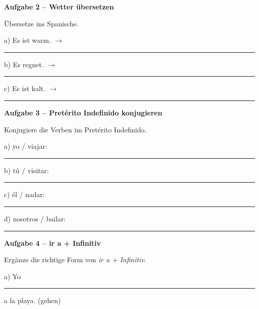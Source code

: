 \documentclass[11pt, a4paper]{article}
\newcommand{\fachfarbe}{spanisch}
\newcommand{\punktebox}[1]{\hfill\fbox{\small \_/#1}}
\newcommand{\luecke}[1]{\rule{#1}{0.4pt}}
\newenvironment{aufgabe}[1]{%
    \needspace{5\baselineskip}%
    \nopagebreak[4]%
    \vspace{10pt}
    \noindent\textbf{\textcolor{\fachfarbe}{Aufgabe #1}}
    \nopagebreak[4]%
    \vspace{5pt}
    \nopagebreak[4]%
    \begin{list}{}{\leftmargin=0pt}
    \item[]
}{%
    \end{list}
}
\begin{document}
\begin{aufgabe}{2 -- Wetter übersetzen}
Übersetze ins Spanische. \punktebox{6}
\end{aufgabe}

\noindent
a) Es ist warm. $\rightarrow$ \luecke{6cm}

\vspace{0.8em}

\noindent
b) Es regnet. $\rightarrow$ \luecke{6cm}

\vspace{0.8em}

\noindent
c) Es ist kalt. $\rightarrow$ \luecke{6cm}

\vspace{15pt}


\begin{aufgabe}{3 -- Pretérito Indefinido konjugieren}
Konjugiere die Verben im Pretérito Indefinido. \punktebox{8}
\end{aufgabe}

\noindent
a) yo / viajar: \luecke{4cm}

\vspace{0.8em}

\noindent
b) tú / visitar: \luecke{4cm}

\vspace{0.8em}

\noindent
c) él / nadar: \luecke{4cm}

\vspace{0.8em}

\noindent
d) nosotros / bailar: \luecke{4cm}

\vspace{15pt}


\begin{aufgabe}{4 -- ir a + Infinitiv}
Ergänze die richtige Form von \textit{ir a + Infinitiv}. \punktebox{6}
\end{aufgabe}

\noindent
a) Yo \luecke{5cm} a la playa. \hfill (gehen)

\vspace{0.8em}
\end{document}
